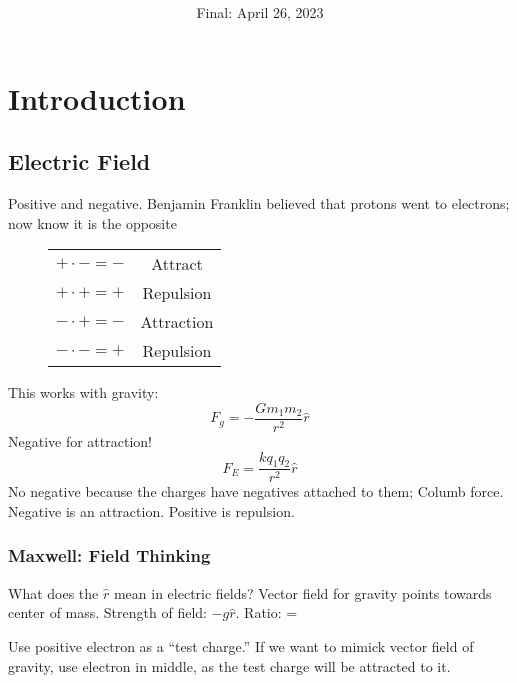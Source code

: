 \documentclass[article, 12pt]{article}
\title{
    \vspace{2in}
    \textmd{\textbf{\courseName}}
    \normalsize\vspace{0.1in}\\
    \vspace{0.1in}\large{\text{\professor}}
    \vspace{3in}
}
\author{\name}
\date{Final: April 26, 2023}
\theoremstyle{definition}
\begin{document}
    \maketitle
    \thispagestyle{empty}
    \pagebreak
    \tableofcontents
    \pagebreak

    \section{Introduction}
    \subsection{Electric Field}
    Positive and negative. Benjamin Franklin believed that protons went to electrons; now know it is the opposite
    \begin{figure}[H]
        \centering
        \begin{tabular}{|c|c|}
            \hline
            $+ \cdot - = -$ & Attract \\
            $+ \cdot + = +$ & Repulsion \\
            $- \cdot + = -$ & Attraction \\
            $- \cdot - = +$ & Repulsion \\
            \hline
        \end{tabular}
    \end{figure}
    This works with gravity:
    \begin{equation*}
        F_g = - \frac{Gm_1 m_2}{r^2}\hat{r}
    \end{equation*}
    Negative for attraction!
    \begin{equation*}
        F_E = \frac{kq_1 q_2}{r^2}\hat{r}
    \end{equation*}
    No negative because the charges have negatives attached to them; Columb force. Negative is an attraction. Positive is repulsion.
    \subsubsection{Maxwell: Field Thinking}
    What does the $\hat{r}$ mean in electric fields? Vector field for gravity points towards center of mass. Strength of field: $-g\hat{r}$. Ratio: \SI{}{\frac{\newton}{\kilogram}} = \SI{}{}

    Use positive electron as a ``test charge.'' If we want to mimick vector field of gravity, use electron in middle, as the test charge will be attracted to it. 
	
\end{document}

